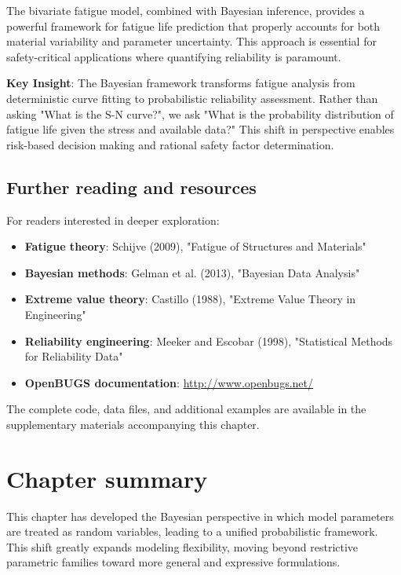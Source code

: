 The bivariate fatigue model, combined with Bayesian inference, provides a powerful framework for fatigue life prediction that properly accounts for both material variability and parameter uncertainty. This approach is essential for safety-critical applications where quantifying reliability is paramount.

\begin{remarkbox}
\begin{remarkT}
\textbf{Key Insight}: The Bayesian framework transforms fatigue analysis from deterministic curve fitting to probabilistic reliability assessment. Rather than asking "What is the S-N curve?", we ask "What is the probability distribution of fatigue life given the stress and available data?" This shift in perspective enables risk-based decision making and rational safety factor determination.
\end{remarkT}
\end{remarkbox}

\subsection{Further reading and resources}

For readers interested in deeper exploration:
\begin{itemize}
\item \textbf{Fatigue theory}: Schijve (2009), "Fatigue of Structures and Materials"
\item \textbf{Bayesian methods}: Gelman et al. (2013), "Bayesian Data Analysis"
\item \textbf{Extreme value theory}: Castillo (1988), "Extreme Value Theory in Engineering"
\item \textbf{Reliability engineering}: Meeker and Escobar (1998), "Statistical Methods for Reliability Data"
\item \textbf{OpenBUGS documentation}: \url{http://www.openbugs.net/}
\end{itemize}
The complete code, data files, and additional examples are available in the supplementary materials accompanying this chapter.

\section{Chapter summary}

This chapter has developed the Bayesian perspective in which model parameters are treated as random variables, leading to a unified probabilistic framework. This shift greatly expands modeling flexibility, moving beyond restrictive parametric families toward more general and expressive formulations.

